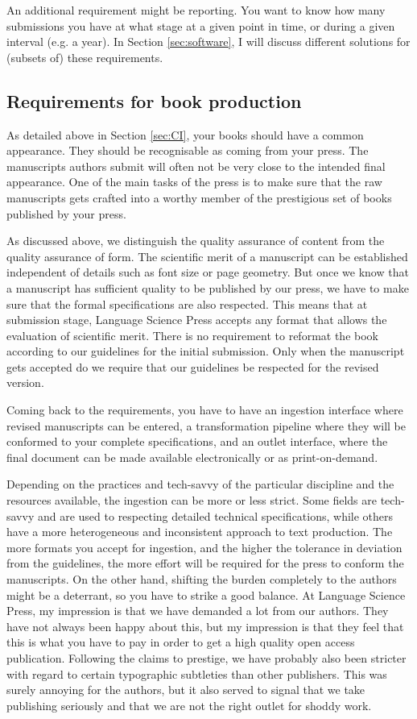 \documentclass[guidelines,nonflat,modfonts] {langsci/langscibook}
\begin{document}
An additional requirement might be reporting. You want to know how many submissions you have at what stage at a given point in time, or during a given interval (e.g. a year). In Section \ref{sec:software}, I will discuss different solutions for (subsets of) these requirements. 
 
 
\subsection{Requirements for book production}
As detailed above in Section \ref{sec:CI}, your books should have a common appearance. They should be recognisable as coming from your press. The manuscripts authors submit will often not be very close to the intended final appearance. One of the main tasks of the press is to make sure that the raw manuscripts gets crafted into a worthy member of the prestigious set of books published by your press. 

As discussed above, we distinguish the quality assurance of content from the quality assurance of form. The scientific merit of a manuscript can be established independent of details such as font size or page geometry. But once we know that a manuscript has sufficient quality to be published by our press, we have to make sure that the formal specifications are also respected. This means that at submission stage, Language Science Press accepts any format that allows the evaluation of scientific merit. There is no requirement to reformat the book according to our guidelines for the initial submission. Only when the manuscript gets accepted do we require that our guidelines be respected for the revised version. 

Coming back to the requirements, you have to have an ingestion interface where revised manuscripts can be entered, a transformation pipeline where they will be conformed to your complete specifications, and an outlet interface, where the final document can be made available electronically or as print-on-demand.

Depending on the practices and tech-savvy of the particular discipline and the resources available, the ingestion can be more or less strict. Some fields are tech-savvy and are used to respecting detailed technical specifications, while others have a more heterogeneous and inconsistent approach to text production. The more formats you accept for ingestion, and the higher the tolerance in deviation from the guidelines, the more effort will be required for the press to conform the manuscripts. On the other hand, shifting the burden completely to the authors might be a deterrant, so you have to strike a good balance. At Language Science Press, my impression is that we have demanded a lot from our authors. They have not always been happy about this, but my impression is that they feel that this is what you have to pay in order to get a high quality open access publication. Following the claims to prestige, we have probably also been stricter with regard to certain typographic subtleties than other publishers. This was surely annoying for the authors, but it also served to signal that we take publishing seriously and that we are not the right outlet for shoddy work. 
\end{document}
